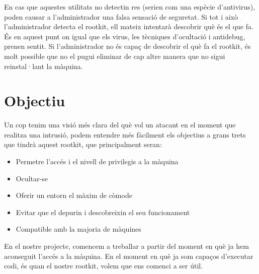 En cas que aquestes utilitats no detectin res (serien com una espècie d'antivirus), poden causar a l'administrador
una falsa sensació de seguretat. Si tot i això l'administrador detecta el rootkit, ell mateix intentarà descobrir 
què és el que fa. És en aquest punt on igual  que els virus, les tècniques d'ocultació i antidebug, prenen sentit.
Si l'administrador no és capaç de descobrir el què fa el rootkit, és molt possible que no el pugui eliminar de cap
altre manera que no sigui reinstal·lant la màquina. \\

\section{Objectiu}

Un cop tenim una visió més clara del què vol un atacant en el moment que realitza una intrusió, podem entendre 
més fàcilment els objectius a grans trets que tindrà aquest rootkit, que principalment seran:

\begin{itemize}
    \item Permetre l'accés i el nivell de privilegis a la màquina
    \item Ocultar-se
    \item Oferir un entorn el màxim de còmode
    \item Evitar que el depurin i descobreixin el seu funcionament
    \item Compatible amb la majoria de màquines
\end{itemize}

En el nostre projecte, comencem a treballar a partir del moment en què ja hem aconseguit l'accés a la
màquina. En el moment en què ja som capaços d'executar codi, és quan el nostre rootkit, volem que ens 
comenci a ser útil. \\
